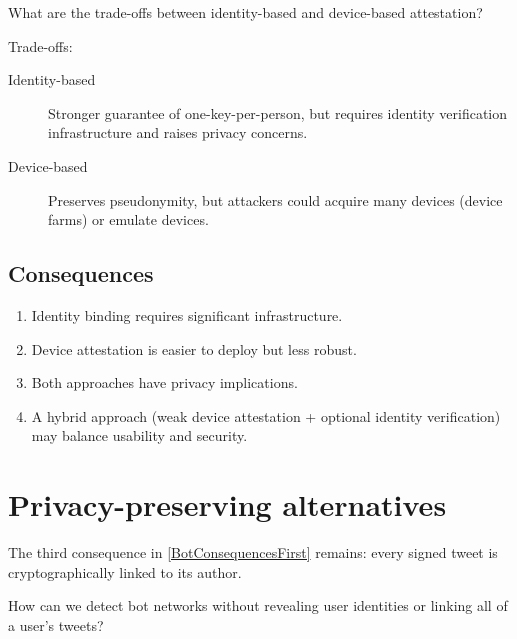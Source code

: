 \begin{exercise}
  What are the trade-offs between identity-based and device-based
  attestation?
\end{exercise}

Trade-offs:
\begin{description}
  \item[Identity-based] Stronger guarantee of one-key-per-person, but
    requires identity verification infrastructure and raises privacy
    concerns.
  \item[Device-based] Preserves pseudonymity, but attackers could
    acquire many devices (device farms) or emulate devices.
\end{description}

\subsection{Consequences}

\begin{enumerate}
  \item Identity binding requires significant infrastructure.
  \item Device attestation is easier to deploy but less robust.
  \item Both approaches have privacy implications.
  \item A hybrid approach (weak device attestation + optional identity
    verification) may balance usability and security.
\end{enumerate}


\section{Privacy-preserving alternatives}\label{BotPrivacy}


The third consequence in \cref{BotConsequencesFirst} remains: every
signed tweet is cryptographically linked to its author.

\begin{exercise}
  How can we detect bot networks without revealing user identities or
  linking all of a user's tweets?
\end{exercise}

